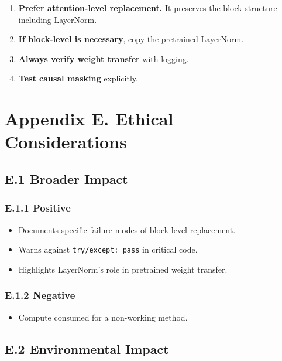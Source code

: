 \begin{enumerate}
\item \textbf{Prefer attention-level replacement.} It preserves the block structure
  including LayerNorm.
\item \textbf{If block-level is necessary}, copy the pretrained LayerNorm.
\item \textbf{Always verify weight transfer} with logging.
\item \textbf{Test causal masking} explicitly.

\end{enumerate}



\section{Appendix E. Ethical Considerations}

\subsection{E.1 Broader Impact}

\subsubsection{E.1.1 Positive}

\begin{itemize}
\item Documents specific failure modes of block-level replacement.
\item Warns against \texttt{try/except: pass} in critical code.
\item Highlights LayerNorm's role in pretrained weight transfer.

\end{itemize}
\subsubsection{E.1.2 Negative}

\begin{itemize}
\item Compute consumed for a non-working method.

\end{itemize}
\subsection{E.2 Environmental Impact}

